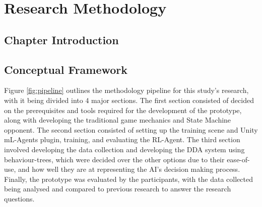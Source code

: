 
\chapter{Research Methodology}
\begin{spacing}{2.0}


	\section{Chapter Introduction}




	\section{Conceptual Framework}

	Figure \ref{fig:pipeline} outlines the methodology pipeline for this study's research, with it being divided into 4 major sections.
	The first section consisted of decided on the prerequisites and tools required for the development of the prototype, along with developing the
	traditional game mechanics and State Machine opponent. The second section consisted of setting up the training scene and Unity mL-Agents plugin,
	training, and evaluating the RL-Agent. The third section involved developing the data collection and developing the DDA system using behaviour-trees,
	which were decided over the other options due to their ease-of-use, and how well they are at representing the AI's decision making process.
	Finally, the prototype was evaluated by the participants, with the data collected being analysed and compared to previous research to answer the research questions.


\end{spacing}
